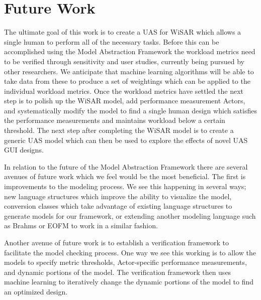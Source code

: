 \section{Future Work}

The ultimate goal of this work is to create a UAS for WiSAR which allows a single human to perform all of the necessary tasks.  Before this can be accomplished using the Model Abstraction Framework the workload metrics need to be verified through sensitivity and user studies, currently being pursued by other researchers.  We anticipate that machine learning algorithms will be able to take data from these to produce a set of weightings which can be applied to the individual workload metrics.  Once the workload metrics have settled the next step is to polish up the WiSAR model, add performance measurement Actors, and systematically modify the model to find a single human design which satisfies the performance measurements and maintains workload below a certain threshold.  The next step after completing the WiSAR model is to create a generic UAS model which can then be used to explore the effects of novel UAS GUI designs.

In relation to the future of the Model Abstraction Framework there are several avenues of future work which we feel would be the most beneficial.  The first is improvements to the modeling process.  We see this happening in several ways; new language structures which improve the ability to visualize the model, conversion classes which take advantage of existing language structures to generate models for our framework, or extending another modeling language such as Brahms or EOFM to work in a similar fashion.

Another avenue of future work is to establish a verification framework to facilitate the model checking process.  One way we see this working is to allow the models to specify metric thresholds, Actor-specific performance measurements, and dynamic portions of the model.  The verification framework then uses machine learning to iteratively change the dynamic portions of the model to find an optimized design.



